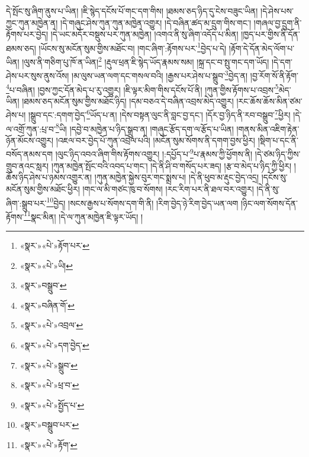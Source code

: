 དེ་སྤོང་སུ་ཞིག་ནུས་པ་ཡིན། །ཇི་སྙེད་དངོས་པོ་གང་དག་གིས། །ཐམས་ཅད་ཉིད་དུ་ངེས་བཟུང་ཡིན། །དེ་ཤེས་པས་ཀྱང་ཀུན་མཁྱེན་ན། །དེ་གཞུང་ཤེས་ཀུན་ཀུན་མཁྱེན་འགྱུར། །དེ་བཞིན་ཚད་མ་དྲུག་གིས་གང་། །གཞལ་བྱ་དྲུག་ནི་རྟོགས་པར་བྱེད། །དེ་ཡང་མདོར་བསྡུས་པར་ཀུན་མཁྱེན། །འགའ་ནི་སུ་ཞིག་འདོད་པ་མིན། །ཁྱད་པར་གྱིས་ནི་དོན་ཐམས་ཅད། །ཡོངས་སུ་མངོན་སུམ་གྱིས་མཐོང་བ། །གང་ཞིག་:རྟོགས་པར་\footnote{«སྣར་»«པེ་»རྟོག་པར་}བྱེད་པ་དེ། །རྟོག་དེ་དོན་མེད་ལོག་པ་ཡིན། །ལུས་ནི་གཅིག་པུ་ཁོ་ན་ཡིན།\footnote{«སྣར་»«པེ་»ཡི།} །རྡུལ་ཕྲན་ཇི་སྙེད་ཡོད་རྣམས་སམ། །སྐྲ་དང་བ་སྤུ་གང་དག་ཡོད། །དེ་དག་ཤེས་པར་སུས་ནུས་འོས། །མ་ལུས་ཡན་ལག་དང་གསལ་བའི། །རྒྱས་པར་ཤེས་པ་སྒྲུབ་\footnote{«སྣར་»བསྒྲུབ་}བྱེད་ན། །བྱ་རོག་སོ་ནི་རྟོག་\footnote{«སྣར་»བཞིན་ོག་}པ་བཞིན། །བྱས་ཀྱང་དོན་མེད་པ་རུ་འགྱུར། །ཇི་ལྟར་མིག་གིས་དངོས་པོ་ནི། །ཀུན་གྱིས་རྟོགས་པ་འབྲས་\footnote{«སྣར་»«པེ་»འབྲལ་}མེད་ཡིན། །ཐམས་ཅད་མངོན་སུམ་གྱིས་མཐོང་ཉིད། །དམ་བཅའ་དེ་བཞིན་འབྲས་མེད་འགྱུར། །རང་ཆོས་ཆོས་མིན་ཙམ་ཤེས་པ། །སྒྲུབ་དང་:དགག་བྱེད་\footnote{«སྣར་»«པེ་»དག་བྱེད་}ཡོད་པ་ན། །དེས་བསྟན་ལུང་ནི་བླང་བྱ་དང་། །དོར་བྱ་ཉིད་ནི་རབ་བསྒྲུབ་\footnote{«སྣར་»«པེ་»སྒྲུབ་}ཕྱིར། །དེ་ལ་འགྲོ་ཀུན་:པྲ་བ་\footnote{«སྣར་»«པེ་»ཕྲ་བ་}ཡི། །དབྱེ་བ་མཁྱེན་པ་ཉིད་སྒྲུབ་ན། །གཞུང་རྩོད་དག་ལ་རྩོད་པ་ཡིན། །གནས་མིན་འཇིག་རྟེན་ཉོན་མོངས་འགྱུར། །འཇལ་བར་བྱེད་པོ་ཀུན་འབྲེལ་པའི། །མངོན་སུམ་སོགས་ནི་དགག་བྱས་ཕྱིར། །སྡིག་པ་དང་ནི་བསོད་ནམས་དག །ལུང་ཉིད་འབའ་ཞིག་གིས་རྟོགས་འགྱུར། །:དཔྱོད་པ་\footnote{«སྣར་»«པེ་»སྤྱོད་པ་}པ་རྣམས་ཀྱི་ཕྱོགས་ནི། །དེ་ཙམ་ཉིད་ཀྱིས་གྲུབ་ནའང་སླར། །ཀུན་མཁྱེན་སྤོང་བའི་འབད་པ་གང་། །དེ་ནི་ཤི་བ་གསོད་པར་ཟད། །རྩ་བ་མེད་པ་ཉིད་ཀྱི་ཕྱིར། །ཆོས་ཉིད་ཤེས་པ་ཉམས་འགྱུར་ན། །ཀུན་མཁྱེན་སྐྱེས་བུར་གང་སྨྲས་པ། །དེ་ནི་ཕུབ་མ་རྡུང་བྱེད་འདྲ། །དངོས་སུ་མངོན་སུམ་གྱིས་མཐོང་ཕྱིར། །གང་ལ་མི་གཙང་ཁུ་བ་སོགས། །རང་རིག་པར་ནི་ཐལ་བར་འགྱུར། །དེ་ནི་སུ་ཞིག་:སྒྲུབ་པར་\footnote{«སྣར་»བསྒྲུབ་པར་}བྱེད། །སངས་རྒྱས་པ་སོགས་དག་གི་ནི། །རིག་བྱེད་ཉེ་རིག་བྱེད་ཡན་ལག །ཉིང་ལག་སོགས་དོན་རྟོགས་\footnote{«སྣར་»«པེ་»རྟོག་}སྣང་མིན། །དེ་ལ་ཀུན་མཁྱེན་ཇི་ལྟར་ཡོད། །
